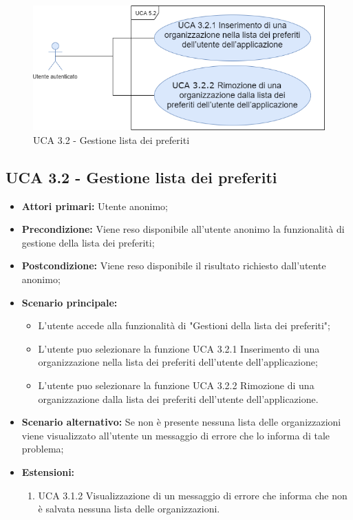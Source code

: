 \begin{figure}[h]
	\centering
	\caption{UCA 3.2 - Gestione lista dei preferiti}
	\includegraphics[scale=0.5]{sezioni/UseCase/Immagini/UCA3.2.png}
\end{figure}

\subsection{UCA 3.2 - Gestione lista dei preferiti}%

\begin{itemize}
	\item \textbf{Attori primari:} Utente anonimo;
	\item \textbf{Precondizione:} Viene reso disponibile all’utente anonimo la funzionalità di gestione della lista dei preferiti; 
	\item \textbf{Postcondizione:} Viene reso disponibile il risultato richiesto dall’utente anonimo;
	\item \textbf{Scenario principale:}
			\begin{itemize}
			\item L’utente accede alla funzionalità di "Gestioni della lista dei preferiti";
			\item L'utente puo selezionare la funzione UCA 3.2.1 Inserimento di una organizzazione nella lista dei preferiti dell’utente dell’applicazione;
			\item L'utente puo selezionare la funzione UCA 3.2.2 Rimozione di una organizzazione dalla lista dei preferiti dell’utente dell’applicazione.
			\end{itemize}
	\item \textbf{Scenario alternativo:} Se non è presente nessuna lista delle organizzazioni viene visualizzato all’utente un messaggio di errore che lo informa di tale problema;
	\item \textbf{Estensioni:}
	\begin{enumerate}
		\item UCA 3.1.2 Visualizzazione di un messaggio di errore che informa che non è salvata nessuna lista delle organizzazioni.
	\end{enumerate}
\end{itemize}


